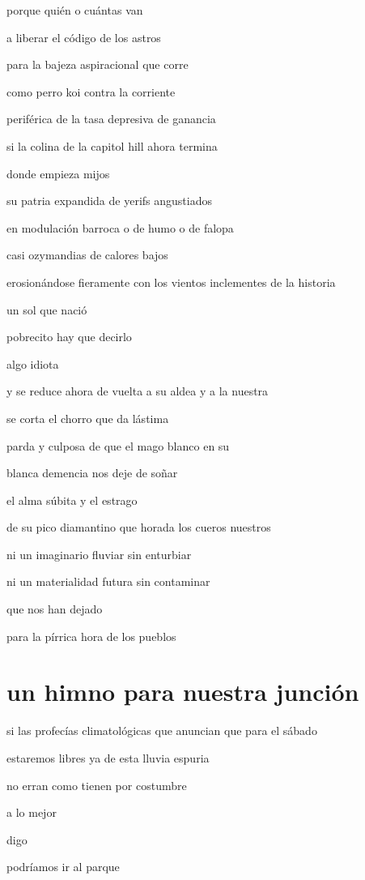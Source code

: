 \documentclass[
]{book}
\begin{document}
porque quién o cuántas van

a liberar el código de los astros

para la bajeza aspiracional que corre

como perro koi contra la corriente

periférica de la tasa depresiva de ganancia

si la colina de la capitol hill ahora termina

donde empieza mijos

su patria expandida de yerifs angustiados

en modulación barroca o de humo o de falopa

casi ozymandias de calores bajos

erosionándose fieramente con los vientos inclementes de la historia

un sol que nació

pobrecito hay que decirlo

algo idiota

y se reduce ahora de vuelta a su aldea y a la nuestra

se corta el chorro que da lástima

parda y culposa de que el mago blanco en su

blanca demencia nos deje de soñar

el alma súbita y el estrago

de su pico diamantino que horada los cueros nuestros

ni un imaginario fluviar sin enturbiar

ni un materialidad futura sin contaminar

que nos han dejado

para la pírrica hora de los pueblos

\hypertarget{un-himno-para-nuestra-junciuxf3n}{%
\chapter{un himno para nuestra junción}\label{un-himno-para-nuestra-junciuxf3n}}

si las profecías climatológicas que anuncian que para el sábado

estaremos libres ya de esta lluvia espuria

no erran como tienen por costumbre

a lo mejor

digo

podríamos ir al parque
\end{document}
